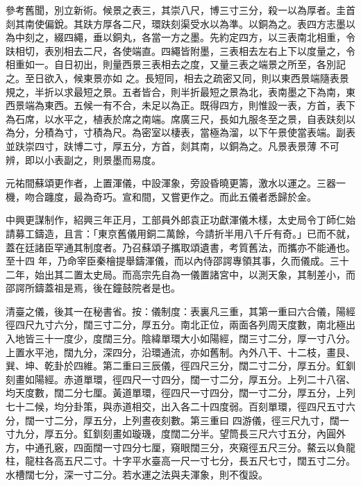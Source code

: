 \begin{pinyinscope}
 參考舊聞，別立新術。候景之表三，其崇八尺，博三寸三分，殺一以為厚者。圭首剡其南使偏銳。其趺方厚各二尺，環趺刻渠受水以為準。以銅為之。表四方志墨以為中刻之，綴四繩，垂以銅丸，各當一方之墨。先約定四方，以三表南北相重，令趺相切，表別相去二尺，各使端直。四繩皆附墨，三表相去左右上下以度量之，令相重如一。自日初出，則量西景三表相去之度，又量三表之端景之所至，各別記之。至日欲入，候東景亦如
 之。長短同，相去之疏密又同，則以東西景端隨表景規之，半折以求最短之景。五者皆合，則半折最短之景為北，表南墨之下為南，東西景端為東西。五候一有不合，未足以為正。既得四方，則惟設一表，方首，表下為石席，以水平之，植表於席之南端。席廣三尺，長如九服冬至之景，自表趺刻以為分，分積為寸，寸積為尺。為密室以棲表，當極為溜，以下午景使當表端。副表並趺崇四寸，趺博二寸，厚五分，方首，剡其南，以銅為之。凡景表景薄
 不可辨，即以小表副之，則景墨而易度。



 元祐間蘇頌更作者，上置渾儀，中設渾象，旁設昏曉更籌，激水以運之。三器一機，吻合躔度，最為奇巧。宣和間，又嘗更作之。而此五儀者悉歸於金。



 中興更謀制作，紹興三年正月，工部員外郎袁正功獻渾儀木樣，太史局令丁師仁始請募工鑄造，且言：「東京舊儀用銅二萬餘，今請折半用八千斤有奇。」已而不就，蓋在廷諸臣罕通其制度者。乃召蘇頌子攜取頌遺書，考質舊法，而攜亦不能通也。至十四
 年，乃命宰臣秦檜提舉鑄渾儀，而以內侍邵諤專領其事，久而儀成。三十二年，始出其二置太史局。而高宗先自為一儀置諸宮中，以測天象，其制差小，而邵諤所鑄蓋祖是焉，後在鐘鼓院者是也。



 清臺之儀，後其一在秘書省。按：儀制度：表裏凡三重，其第一重曰六合儀，陽經徑四尺九寸六分，闊三寸二分，厚五分。南北正位，兩面各列周天度數，南北極出入地皆三十一度少，度闊三分。陰緯單環大小如陽經，闊三寸二分，厚一寸八分。
 上置水平池，闊九分，深四分，沿環通流，亦如舊制。內外八干、十二枝，畫艮、巽、坤、乾卦於四維。第二重曰三辰儀，徑四尺三分，闊二寸二分，厚五分。釭釧刻畫如陽經。赤道單環，徑四尺一寸四分，闊一寸二分，厚五分。上列二十八宿、均天度數，闊二分七厘。黃道單環，徑四尺一寸四分，闊一寸二分，厚五分，上列七十二候，均分卦策，與赤道相交，出入各二十四度弱。百刻單環，徑四尺五寸六分，闊一寸二分，厚五分，上列晝夜刻數。第三重曰
 四游儀，徑三尺九寸，闊一寸九分，厚五分。釭釧刻畫如璇璣，度闊二分半。望筒長三尺六寸五分，內圓外方，中通孔竅，四面闊一寸四分七厘，窺眼闊三分，夾窺徑五尺三分。鰲云以負龍柱，龍柱各高五尺二寸。十字平水臺高一尺一寸七分，長五尺七寸，闊五寸二分。水槽闊七分，深一寸二分。若水運之法與夫渾象，則不復設。




\end{pinyinscope}
